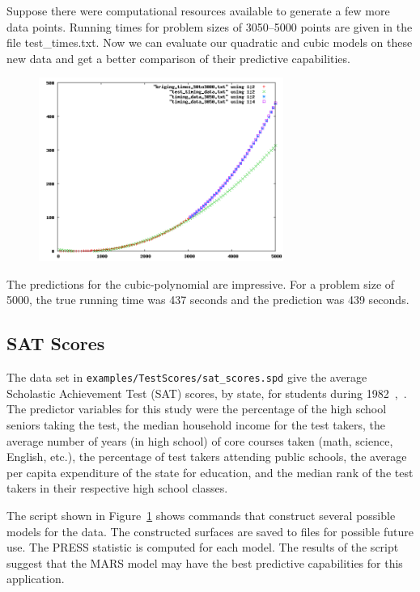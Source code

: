 \documentclass{article}
\begin{document}
Suppose there were computational resources available to generate a few more data
points.  Running times for problem sizes of 3050--5000 points are given in the
file test\_times.txt.  Now we can evaluate our quadratic and cubic models on
these new data and get a better comparison of their predictive capabilities.



\begin{figure}[htbp]
\centering \includegraphics[width=8cm]{TimingMatrixOp/timing_poly2_0to5000_estimates.png}
\end{figure}

The predictions for the cubic-polynomial are impressive.  For a problem size of 5000, the true running time was 437 seconds and the prediction was 439
seconds.

\pagebreak
\subsection {SAT Scores}
The data set in \texttt{examples/TestScores/sat\_scores.spd} give the average Scholastic Achievement Test (SAT) scores, by state, for students during 1982~\cite{powell},~\cite{ramsey}.  The predictor variables for this study were the percentage of the high school seniors taking the test, the median household income for the test takers, the average number of years (in high school) of core courses taken (math, science, English, etc.), the percentage of test takers attending public schools, the average per capita expenditure of the state for education, and the median rank of the test takers in their respective high school classes. 

The script shown in Figure~\ref{fig:test_scores} shows commands that construct several possible models for the data.  The constructed surfaces are saved to files for possible future use.  The PRESS statistic is computed for each model.  The results of the script suggest that the MARS model may have the best predictive capabilities for this application. 
\begin{figure}[htbp]
  \centering
  \begin{bigbox}
	\begin{small}
 	\end{small}
  \end{bigbox}
   \label{fig:test_scores}
\end{figure}
\end{document}
